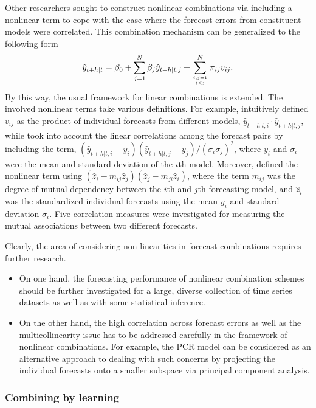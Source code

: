 \documentclass[11pt]{article}
\begin{document}
Other researchers sought to construct nonlinear combinations via including a nonlinear term to cope with the case where the forecast errors from constituent models were correlated. This combination mechanism can be generalized to the following form
\begin{align}
\label{eq:nonlinear_corr}
\tilde{y}_{t+h|t} =\beta_{0}+\sum_{j=1}^{N} \beta_{j} \hat{y}_{t+h|t, j}+\sum_{i,j=1 \atop i<j}^{N}\pi_{ij}v_{i j}.
\end{align}
By this way, the usual framework for linear combinations is extended. The involved nonlinear terms take various definitions. For example, \cite{Freitas2006-fn} intuitively defined $v_{i j}$ as the product of individual forecasts from different models, $\hat{y}_{t+h|t, i} \cdot \hat{y}_{t+h|t, j}$, while \cite{Adhikari2012-ur} took into account the linear correlations among the forecast pairs by including the term, $(\hat{y}_{t+h|t, i}-\bar{y}_{i})(\hat{y}_{t+h|t, j}-\bar{y}_{j})/(\sigma_{i}\sigma_{j})^2$, where $\bar{y}_{i}$ and $\sigma_{i}$ were the mean and standard deviation of the $i$th model. Moreover, \cite{Adhikari2015-bb} defined the nonlinear term using $\left(\hat{z}_{i}-m_{i j} \hat{z}_{j}\right)\left(\hat{z}_{j}-m_{j i} \hat{z}_{i}\right)$, where the term $m_{i j}$ was the degree of mutual dependency between the $i$th and $j$th forecasting model, and $\hat{z}_{i}$ was the standardized individual forecasts using the mean $\bar{y}_{i}$ and standard deviation $\sigma_{i}$. Five correlation measures were investigated for measuring the mutual associations between two different forecasts.

Clearly, the area of considering non-linearities in forecast combinations requires further research.
\begin{itemize}
  \item On one hand, the forecasting performance of nonlinear combination schemes should be further investigated for a large, diverse collection of time series datasets as well as with some statistical inference.
  \item On the other hand, the high correlation across forecast errors as well as the multicollinearity issue has to be addressed carefully in the framework of nonlinear combinations. For example, the PCR model can be considered as an alternative approach to dealing with such concerns by projecting the individual forecasts onto a smaller subspace via principal component analysis.
\end{itemize}

\subsubsection{Combining by learning}
\label{sec:combining_by_learning}
\end{document}
